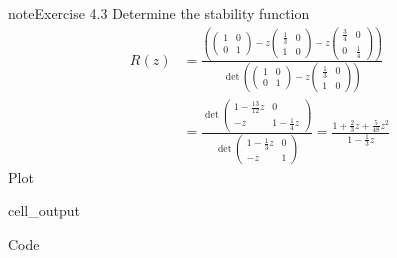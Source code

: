 \documentclass[letterpaper,10pt,english]{jupyterBook}
\begin{document}
\begin{sphinxadmonition}{note}{Exercise 4.3}
\sphinxAtStartPar
Determine the stability function
\begin{align*}
    R(z) &= \frac{\left( 
    \begin{pmatrix} 1 & 0 \\ 0 & 1 \end{pmatrix} - z
    \begin{pmatrix} \frac{1}{3} & 0 \\ 1 & 0 \end{pmatrix} - z
    \begin{pmatrix} \frac{3}{4} & 0 \\ 0 & \frac{1}{4} \end{pmatrix} \right)}{ \det \left(
    \begin{pmatrix} 1 & 0 \\ 0 & 1 \end{pmatrix} - z
    \begin{pmatrix} \frac{1}{3} & 0 \\ 1 & 0 \end{pmatrix} \right)} \\
    &= \frac{\det
    \begin{pmatrix} 1 - \frac{13}{12} z & 0 \\ -z & 1 - \frac{1}{4} z \end{pmatrix}}{\det
    \begin{pmatrix} 1 - \frac{1}{3} z & 0  \\ -z & 1 \end{pmatrix}}
    = \frac{1 + \frac{2}{3} z + \frac{5}{48} z^2}{1 - \frac{1}{3} z}
\end{align*}
\sphinxAtStartPar
Plot
\begin{sphinxVerbatimOutput}

\begin{sphinxuseclass}{cell_output}
\noindent{}

\end{sphinxuseclass}\end{sphinxVerbatimOutput}

\sphinxAtStartPar
Code

\begin{sphinxVerbatim}[commandchars=\\\{\}]
   
   

        
      


\end{sphinxVerbatim}
\end{sphinxadmonition}
\end{document}
